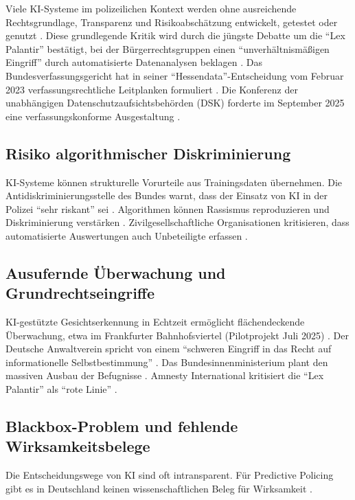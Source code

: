 \documentclass[12pt,a4paper]{article}
\begin{document}
	Viele KI-Systeme im polizeilichen Kontext werden ohne ausreichende Rechtsgrundlage, Transparenz und Risikoabschätzung entwickelt, getestet oder genutzt \cite{Peteranderl2025}. Diese grundlegende Kritik wird durch die jüngste Debatte um die \enquote{Lex Palantir} bestätigt, bei der Bürgerrechtsgruppen einen \enquote{unverhältnismäßigen Eingriff} durch automatisierte Datenanalysen beklagen \cite{FR2026}. Das Bundesverfassungsgericht hat in seiner \enquote{Hessendata}-Entscheidung vom Februar 2023 verfassungsrechtliche Leitplanken formuliert \cite{VerfBlog2026}. Die Konferenz der unabhängigen Datenschutzaufsichtsbehörden (DSK) forderte im September 2025 eine verfassungskonforme Ausgestaltung \cite{DSK2025}.
	
	\subsection{Risiko algorithmischer Diskriminierung}
	
	KI-Systeme können strukturelle Vorurteile aus Trainingsdaten übernehmen. Die Antidiskriminierungsstelle des Bundes warnt, dass der Einsatz von KI in der Polizei \enquote{sehr riskant} sei \cite{Antidisk2025}. Algorithmen können Rassismus reproduzieren und Diskriminierung verstärken \cite{taz2026}. Zivilgesellschaftliche Organisationen kritisieren, dass automatisierte Auswertungen auch Unbeteiligte erfassen \cite{Netzpolitik2025}.
	
	\subsection{Ausufernde Überwachung und Grundrechtseingriffe}
	
	KI-gestützte Gesichtserkennung in Echtzeit ermöglicht flächendeckende Überwachung, etwa im Frankfurter Bahnhofsviertel (Pilotprojekt Juli 2025) \cite{TOnline2025}. Der Deutsche Anwaltverein spricht von einem \enquote{schweren Eingriff in das Recht auf informationelle Selbstbestimmung} \cite{DAV2025}. Das Bundesinnenministerium plant den massiven Ausbau der Befugnisse \cite{DLF2025}. Amnesty International kritisiert die \enquote{Lex Palantir} als \enquote{rote Linie} \cite{Amnesty2026}.
	
	\subsection{Blackbox-Problem und fehlende Wirksamkeitsbelege}
	
	Die Entscheidungswege von KI sind oft intransparent. Für Predictive Policing gibt es in Deutschland keinen wissenschaftlichen Beleg für Wirksamkeit \cite{Peteranderl2025, CILIP2025}.
	
\end{document}
